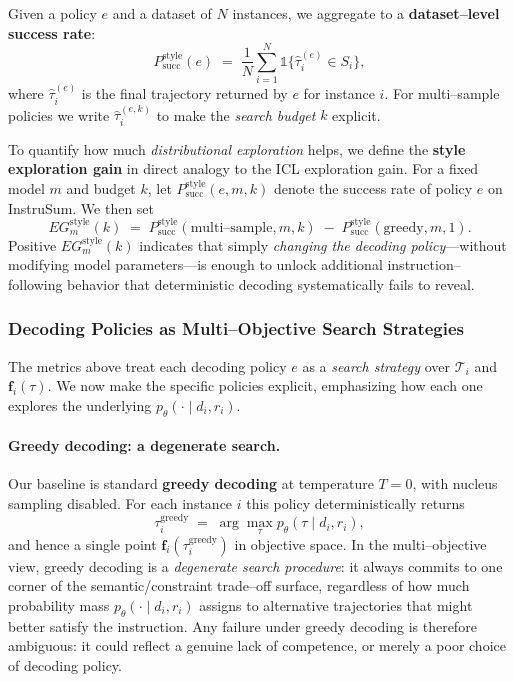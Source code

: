 Given a policy $e$ and a dataset of $N$ instances, we aggregate to a
\textbf{dataset--level success rate}:
\[
  P_{\text{succ}}^{\text{style}}(e)
  \;=\;
  \frac{1}{N}\sum_{i=1}^N
  \mathbb{1}\bigl\{
    \hat{\tau}_i^{(e)} \in S_i
  \bigr\},
\]
where $\hat{\tau}_i^{(e)}$ is the final trajectory returned by $e$ for
instance $i$. For multi--sample policies we write
$\hat{\tau}_i^{(e,k)}$ to make the \emph{search budget} $k$ explicit.

To quantify how much \emph{distributional exploration} helps, we define
the \textbf{style exploration gain} in direct analogy to the ICL
exploration gain. For a fixed model $m$ and budget $k$, let
$P_{\text{succ}}^{\text{style}}(e,m,k)$ denote the success rate of
policy $e$ on InstruSum. We then set
\[
  EG^{\text{style}}_m(k)
  \;=\;
  P_{\text{succ}}^{\text{style}}(\text{multi--sample}, m, k)
  \;-\;
  P_{\text{succ}}^{\text{style}}(\text{greedy}, m, 1).
\]
Positive $EG^{\text{style}}_m(k)$ indicates that simply
\emph{changing the decoding policy}---without modifying model
parameters---is enough to unlock additional instruction--following
behavior that deterministic decoding systematically fails to reveal.

\subsubsection{Decoding Policies as Multi--Objective Search Strategies}
\label{subsubsec:style-policies}

The metrics above treat each decoding policy $e$ as a \emph{search
strategy} over $\mathcal{T}_i$ and $\mathbf{f}_i(\tau)$. We now make the
specific policies explicit, emphasizing how each one explores the
underlying $p_\theta(\cdot \mid d_i, r_i)$.

\paragraph{Greedy decoding: a degenerate search.}
Our baseline is standard \textbf{greedy decoding} at temperature
$T{=}0$, with nucleus sampling disabled. For each instance $i$ this
policy deterministically returns
\[
  \tau_i^{\text{greedy}}
  \;=\;
  \arg\max_\tau p_\theta(\tau \mid d_i, r_i),
\]
and hence a single point $\mathbf{f}_i(\tau_i^{\text{greedy}})$ in
objective space. In the multi--objective view, greedy decoding is a
\emph{degenerate search procedure}: it always commits to one corner of
the semantic/constraint trade--off surface, regardless of how much
probability mass $p_\theta(\cdot \mid d_i, r_i)$ assigns to alternative
trajectories that might better satisfy the instruction. Any failure
under greedy decoding is therefore ambiguous: it could reflect a genuine
lack of competence, or merely a poor choice of decoding policy.

